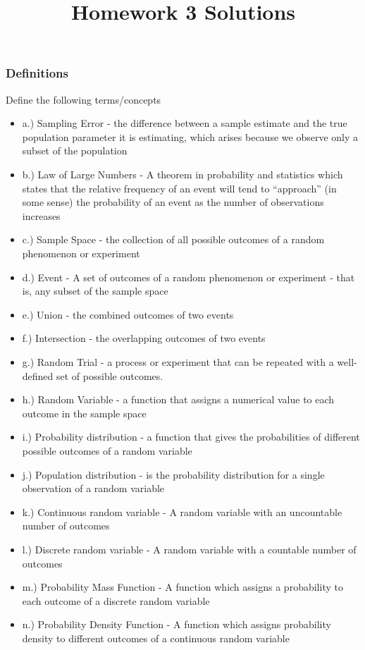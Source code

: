 \documentclass[
]{article}
\title{Homework 3 Solutions}
\author{}
\date{\vspace{-2.5em}}
\begin{document}
\maketitle

\subsubsection{Definitions}\label{definitions}

Define the following terms/concepts

\begin{itemize}
\item
  a.) Sampling Error - {the difference between a sample estimate and the
  true population parameter it is estimating, which arises because we
  observe only a subset of the population}
\item
  b.) Law of Large Numbers - {A theorem in probability and statistics
  which states that the relative frequency of an event will tend to
  ``approach'' (in some sense) the probability of an event as the number
  of observations increases}
\item
  c.) Sample Space - {the collection of all possible outcomes of a
  random phenomenon or experiment}
\item
  d.) Event - {A set of outcomes of a random phenomenon or experiment -
  that is, any subset of the sample space}
\item
  e.) Union - {the combined outcomes of two events}
\item
  f.) Intersection - {the overlapping outcomes of two events}
\item
  g.) Random Trial - {a process or experiment that can be repeated with
  a well-defined set of possible outcomes.}
\item
  h.) Random Variable - {a function that assigns a numerical value to
  each outcome in the sample space}
\item
  i.) Probability distribution - {a function that gives the
  probabilities of different possible outcomes of a random variable}
\item
  j.) Population distribution - {is the probability distribution for a
  single observation of a random variable}
\item
  k.) Continuous random variable - {A random variable with an
  uncountable number of outcomes}
\item
  l.) Discrete random variable - {A random variable with a countable
  number of outcomes}
\item
  m.) Probability Mass Function - {A function which assigns a
  probability to each outcome of a discrete random variable}
\item
  n.) Probability Density Function - {A function which assigns
  probability density to different outcomes of a continuous random
  variable}
\end{itemize}
\end{document}
